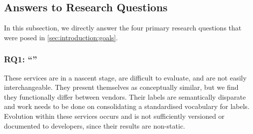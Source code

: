 \subsection{Answers to Research Questions}

In this subsection, we directly answer the four primary research questions that were posed in \cref{sec:introduction:goals}.

\subsubsection[Answering RQ1]{RQ1: ``\RQOneTextLandscapeAnalysis{}''}
\begin{callout}
These services are in a nascent stage, are difficult to evaluate, and are not easily interchangeable. They present themselves as conceptually similar, but we find they functionally differ between vendors. Their labels are semantically disparate and work needs to be done on consolidating a standardised vocabulary for labels. Evolution within these services occurs and is not sufficiently versioned or documented to developers, since their results are non-static.
\end{callout}

